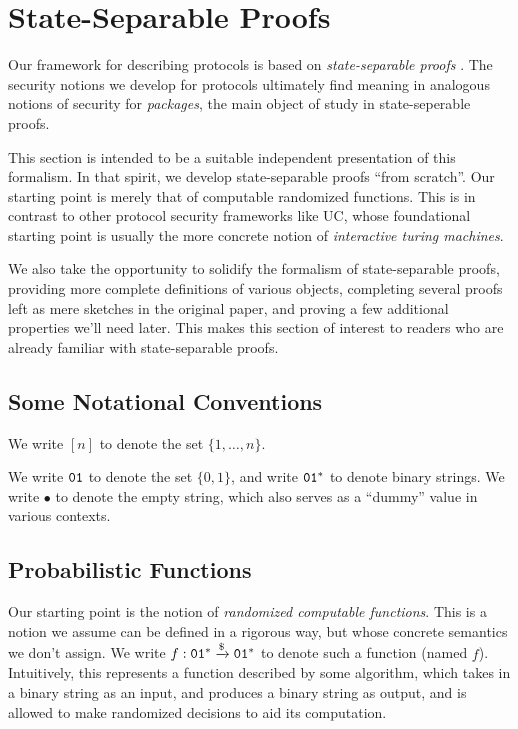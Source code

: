 \section{State-Separable Proofs}

Our framework for describing protocols is based on 
\emph{state-separable proofs}
\cite{AC:BDFKK18}.
The security notions we develop for protocols ultimately
find meaning in analogous notions of security for \emph{packages},
the main object of study in state-seperable proofs.

This section is intended to be a suitable independent presentation
of this formalism.
In that spirit, we develop state-separable proofs ``from scratch''.
Our starting point is merely that of computable randomized functions.
This is in contrast to other protocol security frameworks like UC,
whose foundational starting point is usually the more concrete notion
of \emph{interactive turing machines}.

We also take the opportunity to solidify the formalism of state-separable
proofs, providing more complete definitions of various objects,
completing several proofs left as mere sketches in the original paper,
and proving a few additional properties we'll need later.
This makes this section of interest to readers who are already familiar
with state-separable proofs.

\subsection{Some Notational Conventions}

We write $[n]$ to denote the set $\{1, \ldots, n\}$.

We write $\texttt{01}$ to denote the set $\{0, 1\}$,
and write $\texttt{01}^*$ to denote binary strings.
We write $\bullet$ to denote the empty string,
which also serves as a ``dummy'' value in various contexts.

\subsection{Probabilistic Functions}

Our starting point is the notion of \emph{randomized computable functions}.
This is a notion we assume can be defined in a rigorous way, but whose
concrete semantics we don't assign.
We write $f : \texttt{01}^* \xrightarrow{\$} \texttt{01}^*$ to denote such a function (named $f$).
Intuitively, this represents a function described by some algorithm,
which takes in a binary string as an input, and produces a binary string
as output, and is allowed to make randomized decisions to aid its computation.

